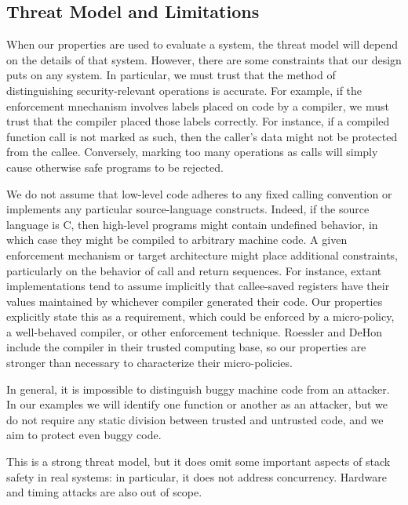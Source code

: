 \documentclass[10pt,conference]{ieeetran}%
\theoremstyle{definition}
\begin{document}
\subsection{Threat Model and Limitations}

When our properties are used to evaluate a system, the threat model
will depend on the details of that system. However, there are some
constraints that our design puts on any system. In particular, we must
trust that the method of distinguishing security-relevant operations
is accurate.  For example, if the enforcement mnechanism involves
labels placed on code by a compiler, we must trust that the compiler
placed those labels correctly. For instance, if a compiled function
call is not marked as such, then the caller's data might not be
protected from the callee.  Conversely, marking too many operations as
calls will simply cause otherwise safe programs to be rejected.


We do not assume that low-level code adheres to any fixed calling
convention or implements any particular source-language constructs.
Indeed, if the source
language is C, then high-level programs might contain undefined
behavior, in which case they might be compiled to arbitrary machine
code. A given enforcement
mechanism or target architecture might place additional constraints, particularly on the behavior of
call and return sequences. For instance, extant implementations tend to assume
implicitly that callee-saved registers have their values maintained by whichever compiler
generated their code. Our properties explicitly state this as a requirement,
which could be enforced by a micro-policy, a well-behaved compiler, or other enforcement technique.
Roessler and DeHon include the compiler in their trusted computing
base, so our properties
are stronger than necessary to characterize their micro-policies.

In general, it is impossible to distinguish buggy machine code from an
attacker.  In our examples we will identify one function or another as
an attacker, but we do not require any static division between trusted
and untrusted code, and we aim to protect even buggy code.

This is a strong threat model, but it does omit some important aspects
of stack safety in real systems: in particular, it does not address
concurrency.  Hardware and timing attacks are also out of scope.
%
\end{document}
